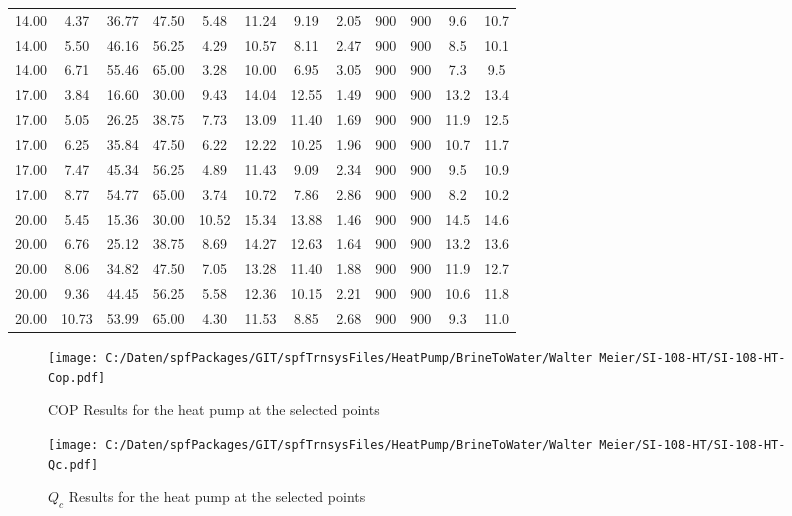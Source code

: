 \documentclass[english]{SPFShortReport}
\begin{document}
\begin{table}[!ht]
\begin{small}
\begin{center}
{\begin{tabular}{l | c c c c c c c c c c c }
14.00 & 4.37 & 36.77 & 47.50 & 5.48 & 11.24 & 9.19 & 2.05 & 900 & 900 & 9.6 & 10.7\\ 
14.00 & 5.50 & 46.16 & 56.25 & 4.29 & 10.57 & 8.11 & 2.47 & 900 & 900 & 8.5 & 10.1\\ 
14.00 & 6.71 & 55.46 & 65.00 & 3.28 & 10.00 & 6.95 & 3.05 & 900 & 900 & 7.3 & 9.5\\ 
17.00 & 3.84 & 16.60 & 30.00 & 9.43 & 14.04 & 12.55 & 1.49 & 900 & 900 & 13.2 & 13.4\\ 
17.00 & 5.05 & 26.25 & 38.75 & 7.73 & 13.09 & 11.40 & 1.69 & 900 & 900 & 11.9 & 12.5\\ 
17.00 & 6.25 & 35.84 & 47.50 & 6.22 & 12.22 & 10.25 & 1.96 & 900 & 900 & 10.7 & 11.7\\ 
17.00 & 7.47 & 45.34 & 56.25 & 4.89 & 11.43 & 9.09 & 2.34 & 900 & 900 & 9.5 & 10.9\\ 
17.00 & 8.77 & 54.77 & 65.00 & 3.74 & 10.72 & 7.86 & 2.86 & 900 & 900 & 8.2 & 10.2\\ 
20.00 & 5.45 & 15.36 & 30.00 & 10.52 & 15.34 & 13.88 & 1.46 & 900 & 900 & 14.5 & 14.6\\ 
20.00 & 6.76 & 25.12 & 38.75 & 8.69 & 14.27 & 12.63 & 1.64 & 900 & 900 & 13.2 & 13.6\\ 
20.00 & 8.06 & 34.82 & 47.50 & 7.05 & 13.28 & 11.40 & 1.88 & 900 & 900 & 11.9 & 12.7\\ 
20.00 & 9.36 & 44.45 & 56.25 & 5.58 & 12.36 & 10.15 & 2.21 & 900 & 900 & 10.6 & 11.8\\ 
20.00 & 10.73 & 53.99 & 65.00 & 4.30 & 11.53 & 8.85 & 2.68 & 900 & 900 & 9.3 & 11.0\\ 
\hline
\hline
\end{tabular}
}
\label{ResultsTable}
\end{center}
\end{small}
\end{table}
\begin{figure}[!ht]
\begin{center}
\texttt{[image: C:/Daten/spfPackages/GIT/spfTrnsysFiles/HeatPump/BrineToWater/Walter Meier/SI-108-HT/SI-108-HT-Cop.pdf]}
\caption{COP Results for the heat pump at the selected points}
\label{COPFig}
\end{center}
\end{figure}
\begin{figure}[!ht]
\begin{center}
\texttt{[image: C:/Daten/spfPackages/GIT/spfTrnsysFiles/HeatPump/BrineToWater/Walter Meier/SI-108-HT/SI-108-HT-Qc.pdf]}
\caption{$Q_c$ Results for the heat pump at the selected points}
\label{QcFig}
\end{center}
\end{figure}
\end{document}
